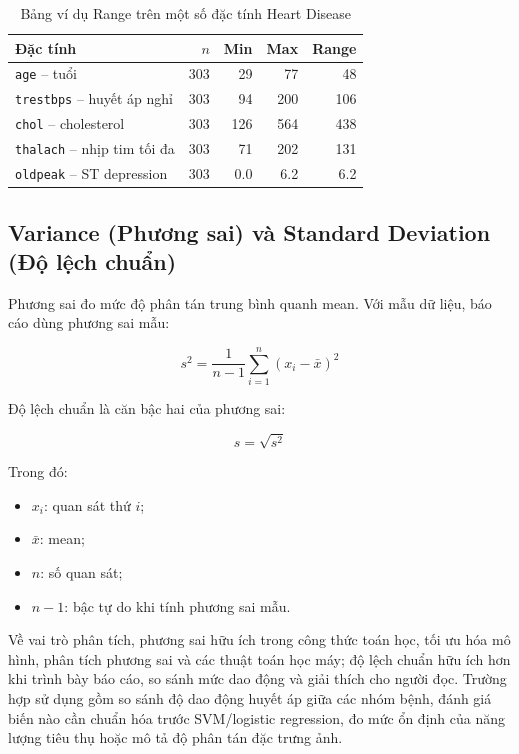\begin{table}[H]
\centering
\caption{Bảng ví dụ Range trên một số đặc tính Heart Disease}
\label{tab:chapter1_range_example}
\small
\begin{tabular}{lrrrr}
\toprule
Đặc tính & $n$ & Min & Max & Range \\
\midrule
\texttt{age} -- tuổi & 303 & 29 & 77 & 48 \\
\texttt{trestbps} -- huyết áp nghỉ & 303 & 94 & 200 & 106 \\
\texttt{chol} -- cholesterol & 303 & 126 & 564 & 438 \\
\texttt{thalach} -- nhịp tim tối đa & 303 & 71 & 202 & 131 \\
\texttt{oldpeak} -- ST depression & 303 & 0.0 & 6.2 & 6.2 \\
\bottomrule
\end{tabular}
\end{table}

\subsection{Variance (Phương sai) và Standard Deviation (Độ lệch chuẩn)}

Phương sai đo mức độ phân tán trung bình quanh mean. Với mẫu dữ liệu, báo cáo dùng phương sai mẫu:

\begin{equation}
s^2 = \frac{1}{n-1}\sum_{i=1}^{n}(x_i - \bar{x})^2
\end{equation}

Độ lệch chuẩn là căn bậc hai của phương sai:

\begin{equation}
s = \sqrt{s^2}
\end{equation}

Trong đó:
\begin{itemize}[leftmargin=1.6em,label=\textbullet]
 \item $x_i$: quan sát thứ $i$;
 \item $\bar{x}$: mean;
 \item $n$: số quan sát;
 \item $n-1$: bậc tự do khi tính phương sai mẫu.
\end{itemize}

Về vai trò phân tích, phương sai hữu ích trong công thức toán học, tối ưu hóa mô hình, phân tích phương sai và các thuật toán học máy; độ lệch chuẩn hữu ích hơn khi trình bày báo cáo, so sánh mức dao động và giải thích cho người đọc. Trường hợp sử dụng gồm so sánh độ dao động huyết áp giữa các nhóm bệnh, đánh giá biến nào cần chuẩn hóa trước SVM/logistic regression, đo mức ổn định của năng lượng tiêu thụ hoặc mô tả độ phân tán đặc trưng ảnh.

